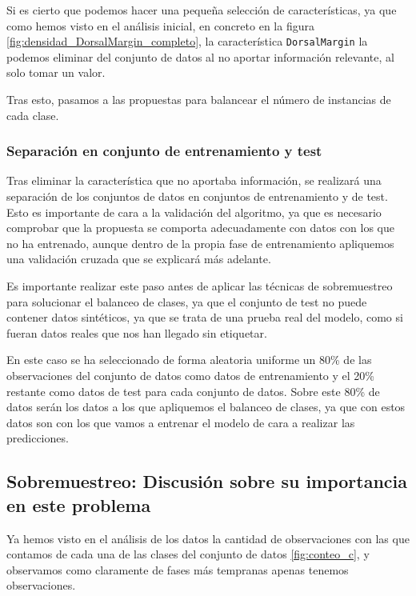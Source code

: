 Si es cierto que podemos hacer una pequeña selección de características, ya que como hemos visto en el análisis inicial, en concreto en la figura \ref{fig:densidad_DorsalMargin_completo}, la característica \texttt{DorsalMargin} la podemos eliminar del conjunto de datos al no aportar información relevante, al solo tomar un valor.

Tras esto, pasamos a las propuestas para balancear el número de instancias de cada clase.

\subsubsection{Separación en conjunto de entrenamiento y test}

Tras eliminar la característica que no aportaba información, se realizará una separación de los conjuntos de datos en conjuntos de entrenamiento y de test. Esto es importante de cara a la validación del algoritmo, ya que es necesario comprobar que la propuesta se comporta adecuadamente con datos con los que no ha entrenado, aunque dentro de la propia fase de entrenamiento apliquemos una validación cruzada que se explicará más adelante.

Es importante realizar este paso antes de aplicar las técnicas de sobremuestreo para solucionar el balanceo de clases, ya que el conjunto de test no puede contener datos sintéticos, ya que se trata de una prueba real del modelo, como si fueran datos reales que nos han llegado sin etiquetar.

En este caso se ha seleccionado de forma aleatoria uniforme un 80\% de las observaciones del conjunto de datos como datos de entrenamiento y el 20\% restante como datos de test para cada conjunto de datos. Sobre este 80\% de datos serán los datos a los que apliquemos el balanceo de clases, ya que con estos datos son con los que vamos a entrenar el modelo de cara a realizar las predicciones.

\newpage

\subsection{Sobremuestreo: Discusión sobre su importancia en este problema}

Ya hemos visto en el análisis de los datos la cantidad de observaciones con las que contamos de cada una de las clases del conjunto de datos \ref{fig:conteo_c}, y observamos como claramente de fases más tempranas apenas tenemos observaciones.

